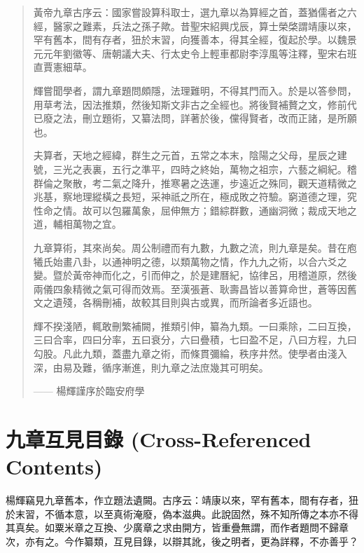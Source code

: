 \documentclass[11pt,a4paper]{article}
\begin{document}
\begin{quote}
\color{prefacecolor}
\setlength{\parindent}{2em}

黃帝九章古序云：國家嘗設算科取士，選九章以為算經之首，蓋猶儒者之六經，醫家之難素，兵法之孫子歟。昔聖宋紹興戊辰，算士榮棨謂靖康以來，罕有舊本，間有存者，狃於末習，向獲善本，得其全經，復起於學。以魏景元元年劉徽等、唐朝議大夫、行太史令上輕車都尉李淳風等注釋，聖宋右班直賈憲細草。

輝嘗聞學者，謂九章題問頗隱，法理難明，不得其門而入。於是以答參問，用草考法，因法推類，然後知斯文非古之全經也。將後賢補贅之文，修前代已廢之法，刪立題術，又纂法問，詳著於後，儻得賢者，改而正諸，是所願也。

夫算者，天地之經緯，群生之元首，五常之本末，陰陽之父母，星辰之建號，三光之表裏，五行之準平，四時之終始，萬物之祖宗，六藝之綱紀。稽群倫之聚散，考二氣之降升，推寒暑之迭運，步遠近之殊同，觀天道精微之兆基，察地理縱橫之長短，采神祇之所在，極成敗之符驗。窮道德之理，究性命之情。故可以包羅萬象，屈伸無方；錯綜群數，通幽洞微；裁成天地之道，輔相萬物之宜。

九章算術，其來尚矣。周公制禮而有九數，九數之流，則九章是矣。昔在庖犧氏始畫八卦，以通神明之德，以類萬物之情，作九九之術，以合六爻之變。暨於黃帝神而化之，引而伸之，於是建曆紀，協律呂，用稽道原，然後兩儀四象精微之氣可得而效焉。至漢張蒼、耿壽昌皆以善算命世，蒼等因舊文之遺殘，各稱刪補，故較其目則與古或異，而所論者多近語也。

輝不揆淺陋，輒敢刪繁補闕，推類引伸，纂為九類。一曰乘除，二曰互換，三曰合率，四曰分率，五曰衰分，六曰疊積，七曰盈不足，八曰方程，九曰勾股。凡此九類，蓋盡九章之術，而條貫彌綸，秩序井然。使學者由淺入深，由易及難，循序漸進，則九章之法庶幾其可明矣。

\begin{flushright}
—— 楊輝謹序於臨安府學
\end{flushright}

\end{quote}

\newpage

\section*{九章互見目錄 (Cross-Referenced Contents)}

楊輝竊見九章舊本，作立題法遺闕。古序云：靖康以來，罕有舊本，間有存者，狃於末習，不循本意，以至真術淹廢，偽本滋典。此說固然，殊不知所傳之本亦不得其真矣。如粟米章之互換、少廣章之求由開方，皆重疊無謂，而作者題問不歸章次，亦有之。今作纂類，互見目錄，以辯其訛，後之明者，更為詳釋，不亦善乎？
\end{document}
